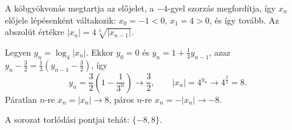 \documentclass[11pt]{scrartcl}
\begin{document}
A köbgyökvonás megtartja az előjelet, a $-4$-gyel szorzás megfordítja, így
$x_n$ előjele lépésenként váltakozik: $x_0 = -1 < 0$, $x_1 = 4 > 0$, és így
tovább. Az abszolút értékre $|x_n| = 4 \sqrt[3]{|x_{n - 1}|}$.

Legyen $y_n = \log_4 |x_n|$. Ekkor $y_0 = 0$ és
$y_n = 1 + \frac{1}{3} y_{n - 1}$, azaz
\(
y_n - \frac{3}{2} = \frac{1}{3} \left( y_{n - 1} - \frac{3}{2} \right)
\),
így
\[
	y_n = \frac{3}{2} \left( 1 - \frac{1}{3^n} \right) \to \frac{3}{2},
	\qquad
	|x_n| = 4^{y_n} \to 4^{\frac{3}{2}} = 8.
\]
Páratlan $n$-re $x_n = |x_n| \to 8$, páros $n$-re $x_n = -|x_n| \to -8$.

A sorozat torlódási pontjai tehát: $\{-8, 8\}$.
\end{document}
